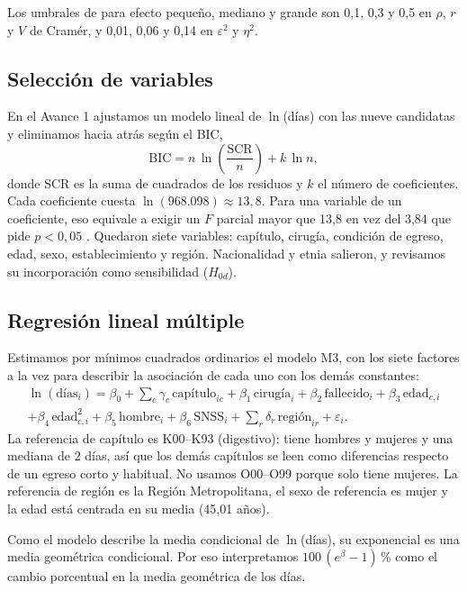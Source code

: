 \documentclass[10.5pt,a4paper,headings=small,abstract=false,bibliography=totoc,listof=totoc]{scrartcl}
\newcommand{\pct}{\,\%}
\begin{document}
Los umbrales de \citet{cohen1988} para efecto pequeño, mediano y grande son 0,1, 0,3 y 0,5 en $\rho$, $r$ y $V$ de Cramér, y 0,01, 0,06 y 0,14 en $\varepsilon^2$ y $\eta^2$.

\subsection{Selección de variables}

En el Avance 1 ajustamos un modelo lineal de $\ln$(días) con las nueve candidatas y eliminamos hacia atrás según el BIC,
\[
\mathrm{BIC}=n\,\ln\!\left(\frac{\mathrm{SCR}}{n}\right)+k\,\ln n,
\]
donde SCR es la suma de cuadrados de los residuos y $k$ el número de coeficientes. Cada coeficiente cuesta $\ln(968.098)\approx 13{,}8$. Para una variable de un coeficiente, eso equivale a exigir un $F$ parcial mayor que 13,8 en vez del 3,84 que pide $p<0{,}05$ \citep{raftery1995}. Quedaron siete variables: capítulo, cirugía, condición de egreso, edad, sexo, establecimiento y región. Nacionalidad y etnia salieron, y revisamos su incorporación como sensibilidad ($H_{0d}$).

\subsection{Regresión lineal múltiple}

Estimamos por mínimos cuadrados ordinarios el modelo M3, con los siete factores a la vez para describir la asociación de cada uno con los demás constantes:
\begin{multline*}
\ln(\text{días}_i)=\beta_0+\sum_c\gamma_c\,\text{capítulo}_{ic}+\beta_1\,\text{cirugía}_i+\beta_2\,\text{fallecido}_i+\beta_3\,\text{edad}_{c,i}\\
+\beta_4\,\text{edad}_{c,i}^2+\beta_5\,\text{hombre}_i+\beta_6\,\text{SNSS}_i+\sum_r\delta_r\,\text{región}_{ir}+\varepsilon_i .
\end{multline*}
La referencia de capítulo es K00--K93 (digestivo): tiene hombres y mujeres y una mediana de 2 días, así que los demás capítulos se leen como diferencias respecto de un egreso corto y habitual. No usamos O00--O99 porque solo tiene mujeres. La referencia de región es la Región Metropolitana, el sexo de referencia es mujer y la edad está centrada en su media (45,01 años).

Como el modelo describe la media condicional de $\ln$(días), su exponencial es una media geométrica condicional. Por eso interpretamos $100\,(e^{\beta}-1)\pct{}$ como el cambio porcentual en la media geométrica de los días.
\end{document}
